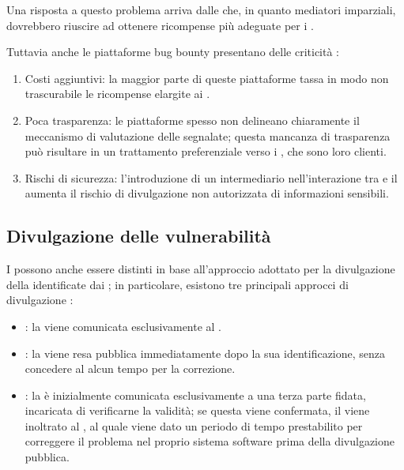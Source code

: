 \medskip

Una risposta a questo problema arriva dalle \bugbountyplatform che, in quanto mediatori imparziali, dovrebbero riuscire ad ottenere ricompense più adeguate per i \BH \cite{canidio2021verioss, akgul2023bughunters}. 

\medskip

Tuttavia anche le piattaforme bug bounty presentano delle criticità \cite{badash2021blockbounty}:
\begin{enumerate}

\item Costi aggiuntivi: la maggior parte di queste piattaforme tassa in modo non trascurabile le ricompense elargite ai \BH.

\item Poca trasparenza: le piattaforme spesso non delineano chiaramente il meccanismo di valutazione delle \vulnerability segnalate; questa mancanza di trasparenza può risultare in un trattamento preferenziale verso i \BI, che sono loro clienti.

\item Rischi di sicurezza: l'introduzione di un intermediario nell'interazione tra \BI e il \BH aumenta il rischio di divulgazione non autorizzata di informazioni sensibili.

\end{enumerate}

\subsection{Divulgazione delle vulnerabilità}

I \BBP possono anche essere distinti in base all'approccio adottato per la divulgazione della \vulnerability identificate dai \BH; in particolare, esistono tre principali approcci di divulgazione \cite{lisi2022ard, cavusoglu2007vulndisc}:
\begin{itemize}

\item \FullVendorDisclosure: la \vulnerability viene comunicata esclusivamente al \BI.

\item \FullPublicDisclosure: la \vulnerability viene resa pubblica immediatamente dopo la sua identificazione, senza concedere al \BI alcun tempo per la correzione.

\item \ResponsibleDisclosure: la \vulnerability è inizialmente comunicata esclusivamente a una terza parte fidata, incaricata di verificarne la validità; se questa viene confermata, il \bugreport viene inoltrato al \BI, al quale viene dato un periodo di tempo prestabilito per correggere il problema nel proprio sistema software prima della divulgazione pubblica.
\end{itemize}

